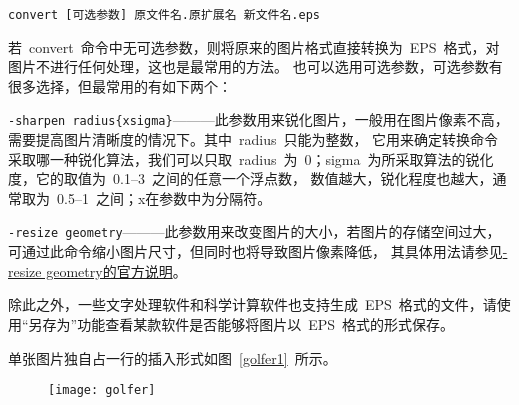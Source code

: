 \noindent\verb|convert [可选参数] 原文件名.原扩展名 新文件名.eps|

\noindent 若~convert~命令中无可选参数，则将原来的图片格式直接转换为~EPS~格式，对图片不进行任何处理，这也是最常用的方法。
也可以选用可选参数，可选参数有很多选择，但最常用的有如下两个：

\verb|-sharpen radius{xsigma}|———此参数用来锐化图片，一般用在图片像素不高，需要提高图片清晰度的情况下。其中~radius~只能为整数，
它用来确定转换命令采取哪一种锐化算法，我们可以只取~radius~为~0；sigma~为所采取算法的锐化度，它的取值为~0.1--3~之间的任意一个浮点数，
数值越大，锐化程度也越大，通常取为~0.5--1~之间；x在参数中为分隔符。

\verb|-resize geometry|———此参数用来改变图片的大小，若图片的存储空间过大，可通过此命令缩小图片尺寸，但同时也将导致图片像素降低，
其具体用法请参见\href{http://www.imagemagick.org/script/command-line-options.php#resize}{-resize geometry的官方说明}。

除此之外，一些文字处理软件和科学计算软件也支持生成~EPS~格式的文件，请使用“另存为”功能查看某款软件是否能够将图片以~EPS~格式的形式保存。

单张图片独自占一行的插入形式如图~\ref{golfer1}~所示。
\begin{figure}[htbp]
	\centering
	\texttt{[image: golfer]}
	\vspace{-1em}
\end{figure}

